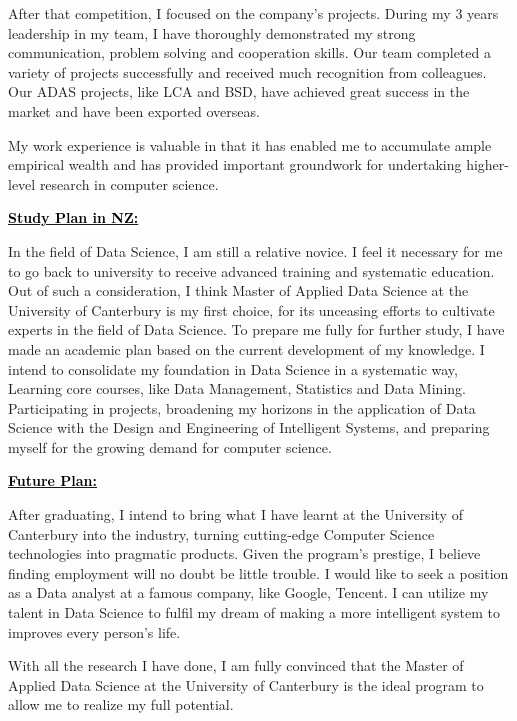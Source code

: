 \documentclass[12pt]{article}
\newcommand{\statement}[1]{\par\medskip
  \underline{\textcolor{black}{\textbf{#1:}}}\space
}
\begin{document}
\bigskip

After that competition, I focused on the company's projects. During my 3 years leadership in my team, I have thoroughly demonstrated my strong communication, problem solving and cooperation skills. Our team completed a variety of projects successfully and received much recognition from colleagues. Our ADAS projects, like LCA and BSD, have achieved great success in the market and have been exported overseas. 

\bigskip

My work experience is valuable in that it has enabled me to accumulate ample empirical wealth and has provided important groundwork for undertaking higher-level research in computer science.

\bigskip

\statement{Study Plan in NZ}
In the field of Data Science, I am still a relative novice. I feel it necessary for me to go back to university to receive advanced training and systematic education. Out of such a consideration, I think Master of Applied Data Science at the University of Canterbury is my first choice, for its unceasing efforts to cultivate experts in the field of Data Science. To prepare me fully for further study, I have made an academic plan based on the current development of my knowledge. I intend to consolidate my foundation in Data Science in a systematic way, Learning core courses, like Data Management, Statistics and Data Mining. Participating in projects, broadening my horizons in the application of Data Science with the Design and Engineering of Intelligent Systems, and preparing myself for the growing demand for computer science. 

\bigskip

\statement{Future Plan}
After graduating, I intend to bring what I have learnt at the University of Canterbury into the industry, turning cutting-edge Computer Science technologies into pragmatic products. Given the program's prestige, I believe finding employment will no doubt be little trouble. I would like to seek a position as a Data analyst at a famous company, like Google, Tencent. I can utilize my talent in Data Science to fulfil my dream of making a more intelligent system to improves every person's life.

\bigskip

With all the research I have done, I am fully convinced that the Master of Applied Data Science at the University of Canterbury is the ideal program to allow me to realize my full potential.
\end{document}
